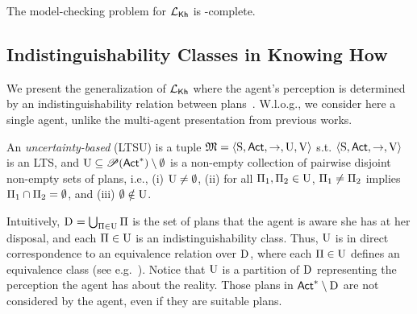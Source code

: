 \begin{proposition}[\cite{DF23}]
    The model-checking problem for ${\mathcal{L}_{{\mathsf{Kh}}}}$ is \PSPACE-complete.
\end{proposition}

\subsection{Indistinguishability Classes in Knowing How}

We present the generalization of ${\mathcal{L}_{{\mathsf{Kh}}}}$ where the agent's perception is determined by an indistinguishability relation between plans~\cite{AFSVQ21,AFSVQ23}. W.l.o.g., we consider here a single agent, unlike the multi-agent presentation from previous works.

\begin{definition}\label{def:ults}
An \emph{uncertainty-based \lts} (LTSU) is a tuple     ${\mathfrak{M}}=\langle{\operatorname{S},{\rm \sf Act},\rightarrow,\operatorname{U},\operatorname{V}}\rangle$ s.t. $\langle{\operatorname{S},{\rm \sf Act},\rightarrow,\operatorname{V}}\rangle$ is an LTS, and 
$\operatorname{U}\subseteq \mathscr{P}({\rm \sf Act}^*)\setminus \emptyset$ is a non-empty collection of pairwise disjoint non-empty sets of plans, i.e., (i) $\operatorname{U}\neq\emptyset$, (ii) for all $\Pi_1,\Pi_2\in\operatorname{U}$, $\Pi_1\neq\Pi_2$ implies  $\Pi_1\cap\Pi_2=\emptyset$, and (iii) $\emptyset\notin\operatorname{U}$. 

\end{definition}

Intuitively, $\operatorname{D}_{} = \bigcup_{\Pi \in \operatorname{U}} \Pi$ is the set of plans that the  agent is aware she has at her disposal, and each $\Pi \in \operatorname{U}$ is an indistinguishability class. Thus, $\operatorname{U}$ is in direct correspondence to an equivalence relation over $\operatorname{D}_{}$, where each $\Pi\in\operatorname{U}$ defines an equivalence class (see e.g.~\cite{AFSVQ23}). 
%
Notice that $\operatorname{U}$ is a partition of $\operatorname{D}_{}$ representing the perception the agent has about the reality.  Those plans in ${\rm \sf Act}^*\setminus\operatorname{D}_{}$ are not considered by the agent, even if they are suitable plans. 

